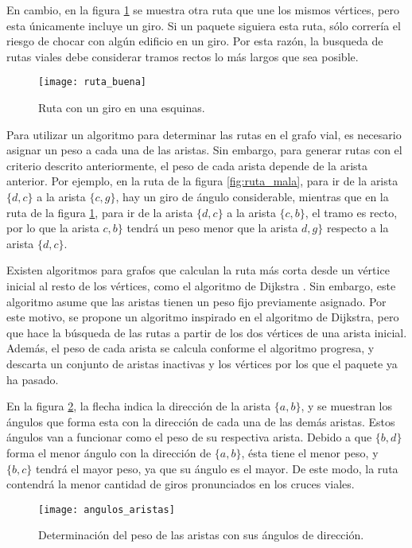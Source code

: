 En cambio, en la figura \ref{fig:ruta_buena} se muestra otra ruta que une los
mismos vértices, pero esta únicamente incluye un giro. Si un paquete siguiera
esta ruta, sólo correría el riesgo de chocar con algún edificio en un giro. Por
esta razón, la busqueda de rutas viales debe considerar tramos rectos lo más
largos que sea posible.

\begin{figure}[th!]
\centering
\texttt{[image: ruta\_buena]}
\decoRule
\caption[Ruta con un giro en una esquinas]{Ruta con un giro en una
esquinas.}
\label{fig:ruta_buena}
\end{figure}

Para utilizar un algoritmo para determinar las rutas en el grafo vial, es
necesario asignar un peso a cada una de las aristas. Sin embargo, para generar
rutas con el criterio descrito anteriormente, el peso de cada arista depende de
la arista anterior. Por ejemplo, en la ruta de la figura \ref{fig:ruta_mala},
para ir de la arista $\{d,c\}$ a la arista $\{c,g\}$, hay un giro de ángulo
considerable, mientras que en la ruta de la figura \ref{fig:ruta_buena}, para
ir de la arista $\{d,c\}$ a la arista $\{c,b\}$, el tramo es recto, por lo que
la arista $c,b\}$ tendrá un peso menor que la arista $d,g\}$ respecto a la
arista $\{d,c\}$.

Existen algoritmos para grafos que calculan la ruta más corta desde un vértice
inicial al resto de los vértices, como el algoritmo de Dijkstra
\cite{cormen2001}. Sin embargo, este algoritmo asume que las aristas tienen un
peso fijo previamente asignado. Por este motivo, se propone un algoritmo
inspirado en el algoritmo de Dijkstra, pero que hace la búsqueda de las rutas a
partir de los dos vértices de una arista inicial. Además, el peso de cada
arista se calcula conforme el algoritmo progresa, y descarta un conjunto de
aristas inactivas y los vértices por los que el paquete ya ha pasado.

En la figura \ref{fig:angulos_aristas}, la flecha indica la dirección de la
arista $\{a,b\}$, y se muestran los ángulos que forma esta con la dirección de
cada una de las demás aristas. Estos ángulos van a funcionar como el peso de su
respectiva arista. Debido a que $\{b,d\}$ forma el menor ángulo con la
dirección de $\{a,b\}$, ésta tiene el menor peso, y $\{b,c\}$ tendrá el mayor
peso, ya que su ángulo es el mayor. De este modo, la ruta contendrá la menor
cantidad de giros pronunciados en los cruces viales.

\begin{figure}[th!]
\centering
\texttt{[image: angulos\_aristas]}
\decoRule
\caption[Determinación del peso de las aristas con sus ángulos de
dirección]{Determinación del peso de las aristas con sus ángulos de dirección.}
\label{fig:angulos_aristas}
\end{figure}

